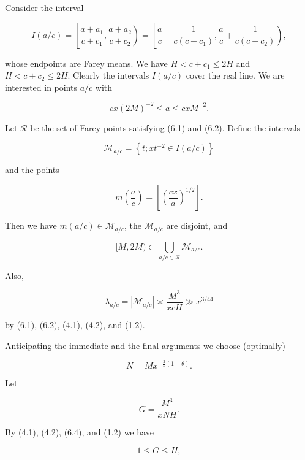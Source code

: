 \documentclass[10pt]{article}
\begin{document}
Consider the interval

$$
I(a / c)=\left[\frac{a+a_{1}}{c+c_{1}}, \frac{a+a_{2}}{c+c_{2}}\right)=\left[\frac{a}{c}-\frac{1}{c\left(c+c_{1}\right)}, \frac{a}{c}+\frac{1}{c\left(c+c_{2}\right)}\right),
$$

whose endpoints are Farey means. We have $H<c+c_{1} \leqslant 2 H$ and $H<c+c_{2} \leqslant 2 H$. Clearly the intervals $I(a / c)$ cover the real line. We are interested in points $a / c$ with


\begin{equation*}
cx(2M)^{-2}\leqslant a\leqslant cxM^{-2} . \tag{6.2}
\end{equation*}


Let $\mathscr{R}$ be the set of Farey points satisfying (6.1) and (6.2).
Define the intervals

$$
\mathscr{M}_{a / c}=\left\{t ; x t^{-2} \in I(a / c)\right\}
$$

and the points

$$
m\left(\frac{a}{c}\right)=\left[\left(\frac{c x}{a}\right)^{1 / 2}\right] .
$$

Then we have $m(a / c) \in \mathscr{M}_{a / c}$, the $\mathscr{M}_{a / c}$ are disjoint, and

$$
[M, 2 M) \subset \bigcup_{a / c \in \mathscr{R}} \mathscr{M}_{a / c} .
$$

Also,


\begin{equation*}
\lambda_{a / c}=\left|\mathscr{M}_{a / c}\right| \asymp \frac{M^{3}}{x c H} \gg x^{3 / 44} \tag{6.3}
\end{equation*}


by (6.1), (6.2), (4.1), (4.2), and (1.2).

Anticipating the immediate and the final arguments we choose (optimally)


\begin{equation*}
N=M x^{-\frac{2}{5}(1-\theta)} . \tag{6.4}
\end{equation*}


Let


\begin{equation*}
G=\frac{M^{3}}{x N H} . \tag{6.5}
\end{equation*}


By (4.1), (4.2), (6.4), and (1.2) we have


\begin{equation*}
1 \leqslant G \leqslant H, \tag{6.6}
\end{equation*}
\end{document}
